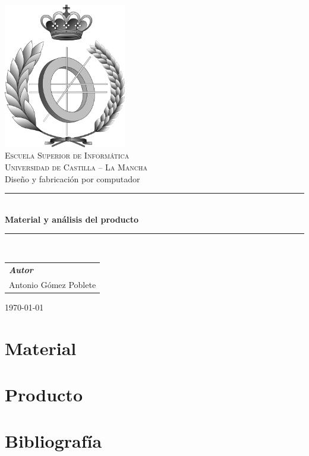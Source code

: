 \documentclass[a4paper,11pt,oneside]{report}
\begin{document}
\pagestyle{plain}



\begin{titlepage}
\begin{center}

\includegraphics[width=0.4\textwidth]{esi_bw.png}\\[1cm]
\textsc{\LARGE Escuela Superior de Informática}\\[0.5cm]
\textsc{\Large Universidad de Castilla -- La Mancha}\\[2.5cm]

{\LARGE Diseño y fabricación por computador}\\[0.5cm]
\rule{\linewidth}{0.5mm}\\[0.4cm]
{\huge \textbf{Material y análisis del producto}}\\[0.4cm]
\rule{\linewidth}{0.5mm}\\[1.5cm]


{\large
\begin{tabular}{l}
\hspace{1cm}\textbf{\emph{Autor}}\\
Antonio Gómez Poblete \\
\end{tabular}
}
\vfill

{\large \today}\\[0.5cm]

\end{center}
\end{titlepage}


\clearpage
{}

\tableofcontents
{}

\clearpage

\pagestyle{fancy}

\chapter{Material}


\chapter{Producto}


\chapter*{Bibliografía}

\end{document}
